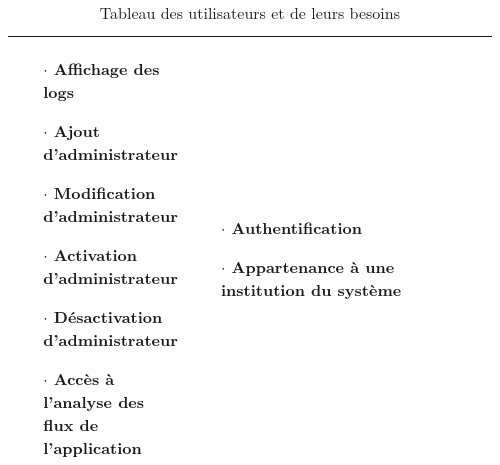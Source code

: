 \begin{table}
\begin{tabular}{|p{0.21\linewidth}|p{0.54\linewidth}|p{0.21\linewidth}|}
\begin{itemize}
                                \item[$\cdot$]  Affichage des logs
                                \item[$\cdot$]  Ajout d'administrateur
                                \item[$\cdot$]  Modification d'administrateur
                                \item[$\cdot$]  Activation d'administrateur
                                \item[$\cdot$]  Désactivation d'administrateur
                                \item[$\cdot$]  Accès à l'analyse des flux de l'application 
                        \end{itemize} & 
                        \begin{itemize}
                                \item[$\cdot$] Authentification 
                                \item[$\cdot$] Appartenance à une institution du système 
                        \end{itemize}
                         \\
                \hline  
        \end{tabular}
        \caption{Tableau des utilisateurs et de leurs besoins} \label{tab:sometab}
\end{table}
\par
